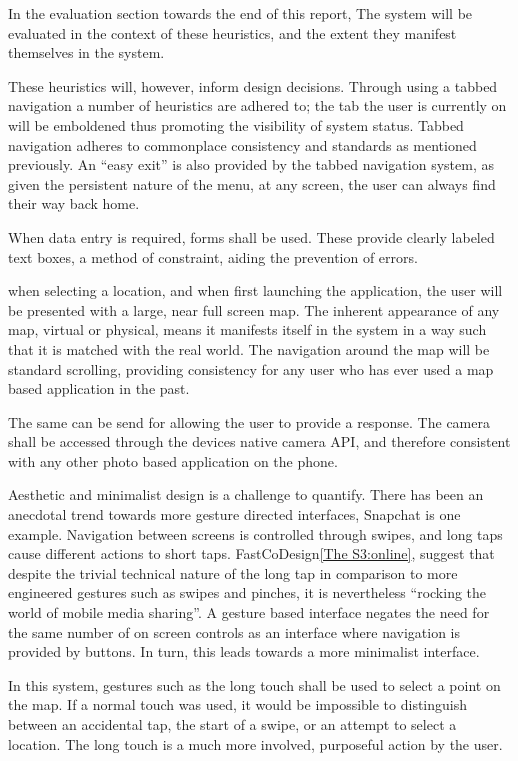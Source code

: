 \documentclass[a4paper]{article}
\begin{document}
In the evaluation section towards the end of this report, The system will be evaluated in the context of these heuristics, and the extent they manifest themselves in the system.

These heuristics will, however, inform design decisions. Through using a tabbed navigation a number of heuristics are adhered to; the tab the user is currently on will be emboldened thus promoting the visibility of system status. Tabbed navigation adheres to commonplace consistency and standards as mentioned previously. An ``easy exit'' is also provided by the tabbed navigation system, as given the persistent nature of the menu, at any screen, the user can always find their way back home.

When data entry is required, forms shall be used. These provide clearly labeled text boxes, a method of constraint, aiding the prevention of errors.

when selecting a location, and when first launching the application, the user will be presented with a large, near full screen map. The inherent appearance of any map, virtual or physical, means it manifests itself in the system in a way such that it is matched with the real world. The navigation around the map will be standard scrolling, providing consistency for any user who has ever used a map based application in the past. 

The same can be send for allowing the user to provide a response. The camera shall be accessed through the devices native camera API, and therefore consistent with any other photo based application on the phone.

Aesthetic and minimalist design is a challenge to quantify. There has been an anecdotal trend towards more gesture directed interfaces, Snapchat is one example. Navigation between screens is controlled through swipes, and long taps cause different actions to short taps. FastCoDesign\ref{The S3:online}, suggest that despite the trivial technical nature of the long tap in comparison to more engineered gestures such as swipes and pinches, it is nevertheless ``rocking the world of mobile media sharing''. A gesture based interface negates the need for the same number of on screen controls as an interface where navigation is provided by buttons. In turn, this leads towards a more minimalist interface.

In this system, gestures such as the long touch shall be used to select a point on the map. If a normal touch was used, it would be impossible to distinguish between an accidental tap, the start of a swipe, or an attempt to select a location. The long touch is a much more involved, purposeful action by the user.
\end{document}
